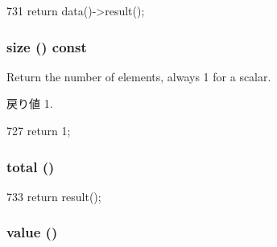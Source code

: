 \begin{DoxyCode}
731 { return data()->result(); }
\end{DoxyCode}
\hypertarget{classStats_1_1ScalarBase_a503ab01f6c0142145d3434f6924714e7}{
\subsubsection[{size}]{ size () const}}
\label{classStats_1_1ScalarBase_a503ab01f6c0142145d3434f6924714e7}
Return the number of elements, always 1 for a scalar. \begin{DoxyReturn}{戻り値}
1. 
\end{DoxyReturn}



\begin{DoxyCode}
727 { return 1; }
\end{DoxyCode}
\hypertarget{classStats_1_1ScalarBase_a9ce6f3b063255d3afd5627cde6f61f2c}{
\subsubsection[{total}]{ total ()}}
\label{classStats_1_1ScalarBase_a9ce6f3b063255d3afd5627cde6f61f2c}



\begin{DoxyCode}
733 { return result(); }
\end{DoxyCode}
\hypertarget{classStats_1_1ScalarBase_aced120d8613c6808b53daaa566cbaa27}{
\subsubsection[{value}]{ value ()}}
\label{classStats_1_1ScalarBase_aced120d8613c6808b53daaa566cbaa27}



